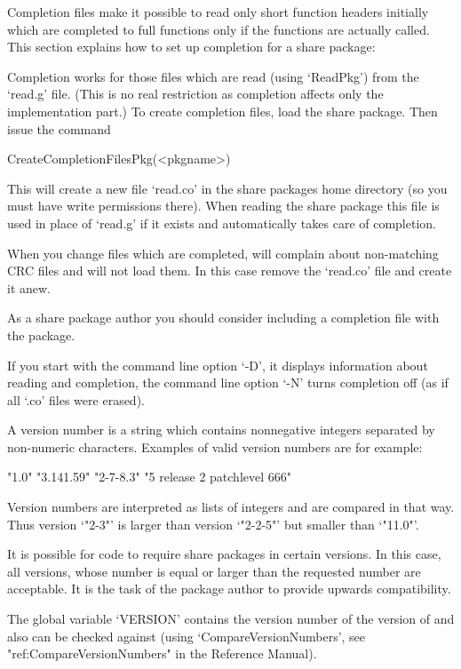 Completion files make it possible to read only short function headers
initially which are completed to full functions only if the functions are
actually called.  This section explains how to set up completion for a share
package:

Completion works for those files which are read (using `ReadPkg')
from the `read.g' file. (This is no real restriction as completion affects
only the implementation part.) To create completion files, load the share
package. Then issue the command

\>CreateCompletionFilesPkg(<pkgname>)

This will create a new file `read.co' in the share packages home directory
(so you must have write permissions there). When reading the share package
this file is used in place of `read.g' if it exists and automatically takes
care of completion.

When you change files which are completed, {\GAP} will complain about
non-matching CRC files and will not load them. In this case remove
the `read.co' file and create it anew.

As a share package author you should consider including a completion file
with the package.

If you start {\GAP} with the command line option `-D', it displays
information about reading and completion, the command line option `-N' turns
completion off (as if all `.co' files were erased).


A version number is a string which contains nonnegative integers separated
by non-numeric characters. Examples of valid version numbers are for
example:

\begintt
"1.0"   "3.141.59"  "2-7-8.3" "5 release 2 patchlevel 666"
\endtt

Version numbers are interpreted as lists of integers and are compared in
that way. Thus version `"2-3"' is larger than version `"2-2-5"' but smaller
than `"11.0"'.

It is possible for code to require share packages in certain versions. In
this case, all versions, whose number is equal or larger than the requested
number are acceptable. It is the task of the package author to provide
upwards compatibility.

The global variable `VERSION' contains the version number of the version of
{\GAP} and also can be checked against (using `CompareVersionNumbers', see
"ref:CompareVersionNumbers" in the Reference Manual).


